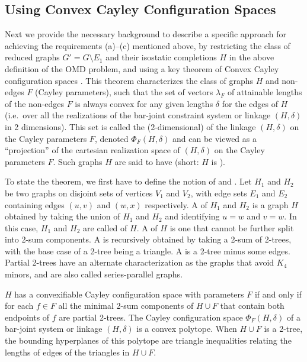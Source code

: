 \subsection{Using Convex Cayley Configuration Spaces}
\label{sec:2-tree-reduction}
%
Next we provide the necessary background to describe a specific approach for achieving the requirements (a)--(c) mentioned above, by restricting the class of reduced graphs $G' = G\setminus E_1$ and their isostatic completions $H$ in the above definition of the OMD problem, and using a key theorem of Convex Cayley configuration spaces \cite{sitharam2010convex}. This theorem characterizes the class of graphs $H$ and non-edges $F$ (Cayley parameters), such that the set of vectors $\lambda_F$ of  attainable lengths of the non-edges $F$ is always convex for any given lengths $\delta$ for the edges of $H$ (i.e.\ over all the realizations of the bar-joint constraint system or linkage $(H,\delta)$ in 2 dimensions). This set is called the (2-dimensional)  of the linkage $(H,\delta)$ on the Cayley parameters $F$, denoted $\Phi_F(H,\delta)$ and can be viewed as a ``projection'' of the cartesian realization space of $(H,\delta)$ on the Cayley parameters $F$. Such graphs $H$ are said to have  (short: $H$ is ).

To state the theorem, we first have to define the notion of  and . Let $H_1$ and $H_2$ be two graphs on disjoint sets of vertices $V_1$ and $V_2$, with edge sets $E_1$ and $E_2$ containing edges $(u,v)$ and $(w,x)$ respectively.
A  of $H_1$ and $H_2$ is a graph $H$ obtained by taking the union of $H_1$ and $H_2$ and identifying $u=w$ and $v=w$. In this case, $H_1$ and $H_2$ are called  of $H$. A  of $H$ is  one that cannot be further split into 2-sum components. A  is recursively obtained by taking a 2-sum of 2-trees, with the base case of a 2-tree being a triangle. A  is a 2-tree minus some edges. Partial 2-trees have an alternate characterization as the graphs that avoid $K_4$ minors, and are also called series-parallel graphs.

\begin{theorem}
\label{theorem:convexcayley}
    \cite{sitharam2010convex} $H$ has a convexifiable Cayley configuration space with parameters $F$ if and only if for each $f\in F$ all the minimal 2-sum components of $H\cup F$ that contain both endpoints of $f$ are partial 2-trees. The Cayley configuration space $\Phi_F(H,\delta)$ of a bar-joint system or linkage $(H,\delta)$ is a convex polytope. When $H\cup F$ is a 2-tree, the bounding hyperplanes of this polytope are triangle inequalities relating the lengths of edges of the triangles in $H\cup F$.
\end{theorem}

